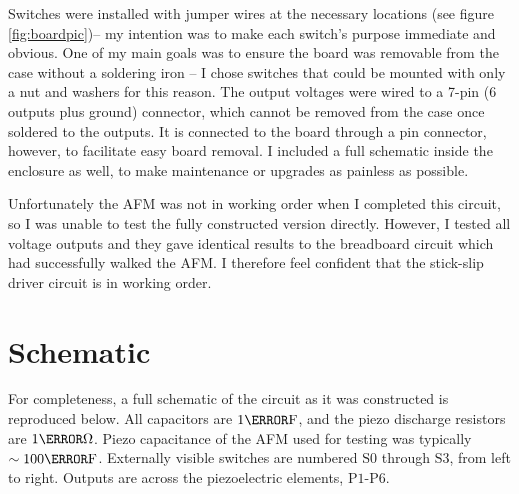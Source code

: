\documentclass[12pt]{article}
\begin{document}
Switches were installed with jumper wires at the necessary locations (see figure \ref{fig:boardpic})-- my intention was to make each switch's purpose immediate and obvious.
One of my main goals was to ensure the board was removable from the case without a soldering iron -- I chose switches that could be mounted with only a nut and washers for this reason.
The output voltages were wired to a 7-pin (6 outputs plus ground) connector, which cannot be removed from the case once soldered to the outputs. It is connected to the board through a pin connector, however, to facilitate easy board removal. I included a full schematic inside the enclosure as well, to make maintenance or upgrades as painless as possible.
\par Unfortunately the AFM was not in working order when I completed this circuit, so I was unable to test the fully constructed version directly. However, I tested all voltage outputs and they gave identical results to the breadboard circuit which had successfully walked the AFM. I therefore feel confident that the stick-slip driver circuit is in working order.

\section{Schematic}
\par For completeness, a full schematic of the circuit as it was constructed is reproduced below. All capacitors are $1\micro\farad$, and the piezo discharge resistors are $1\mega\ohm$. Piezo capacitance of the AFM used for testing was typically $\sim 100\nano\farad$. Externally visible switches are numbered $\textrm{S0}$ through $\textrm{S3}$, from left to right. Outputs are across the piezoelectric elements, $\textrm{P1}$-$\textrm{P6}$.
%
\end{document}

